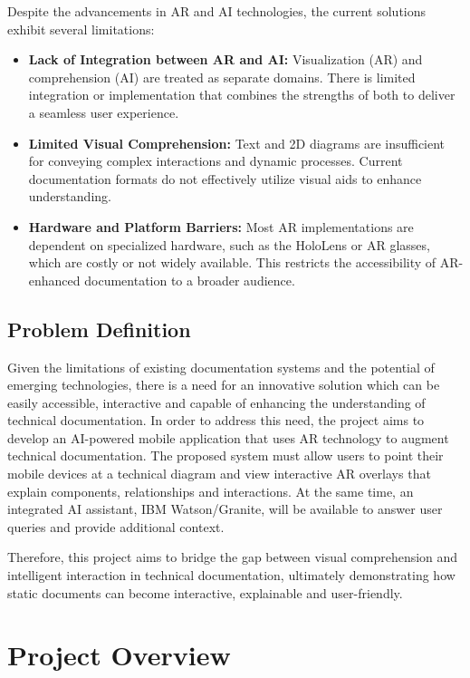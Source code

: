 \documentclass[12pt]{article}
\begin{document}
        Despite the advancements in AR and AI technologies, the current solutions exhibit several limitations:
        \begin{itemize}
            \item \textbf{Lack of Integration between AR and AI:}
                Visualization (AR) and comprehension (AI) are treated as separate domains. There is limited integration or implementation that combines the strengths of both to deliver a seamless user experience.
            \item \textbf{Limited Visual Comprehension:}
                Text and 2D diagrams are insufficient for conveying complex interactions and dynamic processes. Current documentation formats do not effectively utilize visual aids to enhance understanding.
            \item \textbf{Hardware and Platform Barriers:}
                Most AR implementations are dependent on specialized hardware, such as the HoloLens or AR glasses, which are costly or not widely available. This restricts the accessibility of AR-enhanced documentation to a broader audience.
        \end{itemize}

    \subsection{Problem Definition}

    Given the limitations of existing documentation systems and the potential of emerging technologies, there is a need for an innovative solution which can be easily accessible, interactive and capable of enhancing
    the understanding of technical documentation. In order to address this need, the project aims to develop an AI-powered mobile application that uses AR technology to augment technical documentation. The proposed system must 
    allow users to point their mobile devices at a technical diagram and view interactive AR overlays that explain components, relationships and interactions. At the same time, an integrated AI assistant, IBM Watson/Granite,
    will be available to answer user queries and provide additional context.  

        Therefore, this project aims to bridge the gap between visual comprehension and intelligent interaction in technical documentation, ultimately demonstrating how static documents can become interactive, explainable and user-friendly.


\section{Project Overview}
\end{document}
